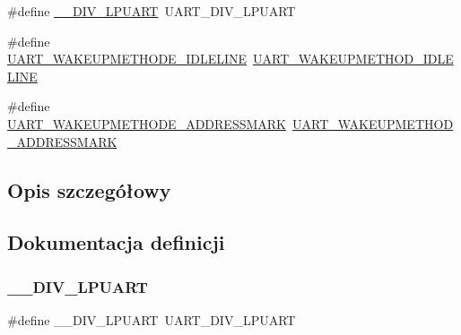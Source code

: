 \begin{DoxyCompactItemize}
\item 
\#define \hyperlink{group___h_a_l___u_a_r_t___aliased___defines_gaa81cd3c42fac5a329fd499964658c20e}{\+\_\+\+\_\+\+D\+I\+V\+\_\+\+L\+P\+U\+A\+RT}~U\+A\+R\+T\+\_\+\+D\+I\+V\+\_\+\+L\+P\+U\+A\+RT
\item 
\#define \hyperlink{group___h_a_l___u_a_r_t___aliased___defines_gab6e73a11dc29f715c2f3e48df9d9f30f}{U\+A\+R\+T\+\_\+\+W\+A\+K\+E\+U\+P\+M\+E\+T\+H\+O\+D\+E\+\_\+\+I\+D\+L\+E\+L\+I\+NE}~\hyperlink{group___u_a_r_t___wake_up__functions_ga2411ed44c5d82db84c5819e1e2b5b8b3}{U\+A\+R\+T\+\_\+\+W\+A\+K\+E\+U\+P\+M\+E\+T\+H\+O\+D\+\_\+\+I\+D\+L\+E\+L\+I\+NE}
\item 
\#define \hyperlink{group___h_a_l___u_a_r_t___aliased___defines_ga0535d8a60a1563f7216a0f4b62a39c43}{U\+A\+R\+T\+\_\+\+W\+A\+K\+E\+U\+P\+M\+E\+T\+H\+O\+D\+E\+\_\+\+A\+D\+D\+R\+E\+S\+S\+M\+A\+RK}~\hyperlink{group___u_a_r_t___wake_up__functions_ga4c6935f26f8f2a9fe70fd6306a9882cb}{U\+A\+R\+T\+\_\+\+W\+A\+K\+E\+U\+P\+M\+E\+T\+H\+O\+D\+\_\+\+A\+D\+D\+R\+E\+S\+S\+M\+A\+RK}
\end{DoxyCompactItemize}


\subsection{Opis szczegółowy}


\subsection{Dokumentacja definicji}
\mbox{\label{group___h_a_l___u_a_r_t___aliased___defines_gaa81cd3c42fac5a329fd499964658c20e}} 
\subsubsection{\texorpdfstring{\+\_\+\+\_\+\+D\+I\+V\+\_\+\+L\+P\+U\+A\+RT}{\_\_DIV\_LPUART}}
{\footnotesize\ttfamily \#define \+\_\+\+\_\+\+D\+I\+V\+\_\+\+L\+P\+U\+A\+RT~U\+A\+R\+T\+\_\+\+D\+I\+V\+\_\+\+L\+P\+U\+A\+RT}



